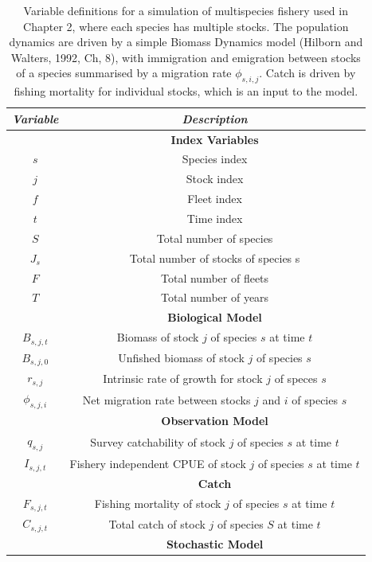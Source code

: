 \documentclass[]{scrartcl}
\begin{document}
\newpage

\begin{table}[htbp]
\begin{center}
\caption{Variable definitions for a simulation of multispecies fishery used in Chapter 2, where each species has multiple stocks. The population dynamics are driven by a simple Biomass Dynamics model (Hilborn and Walters, 1992, Ch, 8), with immigration and emigration between stocks of a species summarised by a migration rate $\phi_{s,i,j}$. Catch is driven by fishing mortality for individual stocks, which is an input to the model.}\label{tab:OMspec}
\begin{tabular}{c|c}
\textit{Variable} & \textit{Description}  \\
\hline
& \textbf{ Index Variables} \\
\hline
$s$ & Species index \\
$j$ & Stock index \\
$f$ & Fleet index \\
$t$ & Time index \\
$S$ & Total number of species \\
$J_s$ & Total number of stocks of species s \\
$F$ & Total number of fleets \\
$T$ & Total number of years \\
\hline
& \textbf{ Biological Model} \\
\hline
$B_{s,j,t}$ & Biomass of stock $j$ of species $s$ at time $t$ \\
$B_{s,j,0}$ & Unfished biomass of stock $j$ of species $s$ \\
$r_{s,j}$ & Intrinsic rate of growth for stock $j$ of speces $s$ \\
$\phi_{s,j,i}$ &  Net migration rate between stocks $j$ and $i$ of species $s$ \\
\hline
& \textbf{ Observation Model} \\
\hline
$q_{s,j}$ & Survey catchability of stock $j$ of species $s$ at time $t$ \\
$I_{s,j,t}$ & Fishery independent CPUE of stock $j$ of species $s$ at time $t$ \\
\hline
& \textbf{ Catch} \\
\hline
$F_{s,j,t}$ & Fishing mortality of stock $j$ of species $s$ at time $t$ \\
$C_{s,j,t}$ & Total catch of stock $j$ of species $S$ at time $t$ \\
\hline
& \textbf{ Stochastic Model } \\

\end{tabular}
\end{center}
\end{table}
\end{document}
